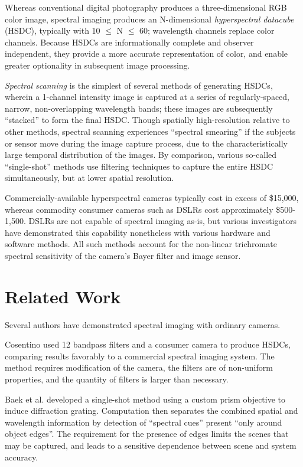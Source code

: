 \documentclass[twocolumn,10pt]{asme2ej}
\begin{document}

Whereas conventional digital photography produces a three-dimensional RGB color image, spectral imaging produces an N-dimensional \textit{hyperspectral datacube} (HSDC), typically with 10 $\leq$ N $\leq$ 60; wavelength channels replace color channels. Because HSDCs are informationally complete and observer independent, they provide a more accurate representation of color, and enable greater optionality in subsequent image processing.


\textit{Spectral scanning} is the simplest of several methods of generating HSDCs, wherein a 1-channel intensity image is captured at a series of regularly-spaced, narrow, non-overlapping wavelength bands; these images are subsequently ``stacked'' to form the final HSDC. Though spatially high-resolution relative to other methods, spectral scanning experiences ``spectral smearing'' if the subjects or sensor move during the image capture process, due to the characteristically large temporal distribution of the images. By comparison, various so-called ``single-shot'' methods use filtering techniques to capture the entire HSDC simultaneously, but at lower spatial resolution.


Commercially-available hyperspectral cameras typically cost in excess of \$15,000, whereas commodity consumer cameras such as DSLRs cost approximately \$500-1,500. DSLRs are not capable of spectral imaging as-is, but various investigators have demonstrated this capability nonetheless with various hardware and software methods. All such methods account for the non-linear trichromate spectral sensitivity of the camera's Bayer filter and image sensor.

\section{Related Work}

\noindent Several authors have demonstrated spectral imaging with ordinary cameras.

Cosentino \cite{Cosentino} used 12 bandpass filters and a consumer camera to produce HSDCs, comparing results favorably to a commercial spectral imaging system. The method requires modification of the camera, the filters are of non-uniform properties, and the quantity of filters is larger than necessary.

Baek et al. \cite{Baek} developed a single-shot method using a custom prism objective to induce diffraction grating. Computation then separates the combined spatial and wavelength information by detection of ``spectral cues'' present ``only around object edges''. The requirement for the presence of edges limits the scenes that may be captured, and leads to a sensitive dependence between scene and system accuracy.
\end{document}
